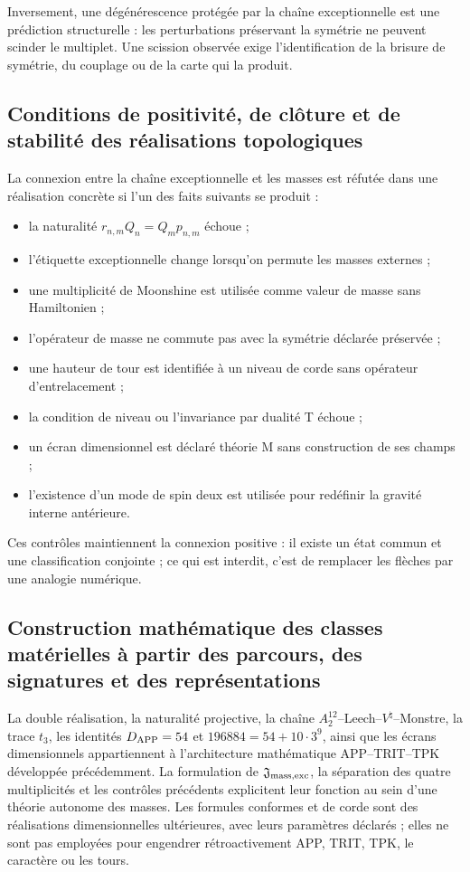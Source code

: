 Inversement, une dégénérescence protégée par la chaîne exceptionnelle est une prédiction structurelle : les perturbations préservant la symétrie ne peuvent scinder le multiplet. Une scission observée exige l’identification de la brisure de symétrie, du couplage ou de la carte qui la produit.

\subsection{Conditions de positivité, de clôture et de stabilité des réalisations topologiques}
La connexion entre la chaîne exceptionnelle et les masses est réfutée dans une réalisation concrète si l’un des faits suivants se produit :

\begin{itemize}
\item la naturalité \(r_{n,m}Q_n=Q_mp_{n,m}\) échoue ;
\item l’étiquette exceptionnelle change lorsqu’on permute les masses externes ;
\item une multiplicité de Moonshine est utilisée comme valeur de masse sans Hamiltonien ;
\item l’opérateur de masse ne commute pas avec la symétrie déclarée préservée ;
\item une hauteur de tour est identifiée à un niveau de corde sans opérateur d’entrelacement ;
\item la condition de niveau ou l’invariance par dualité T échoue ;
\item un écran dimensionnel est déclaré théorie M sans construction de ses champs ;
\item l’existence d’un mode de spin deux est utilisée pour redéfinir la gravité interne antérieure.

\end{itemize}
Ces contrôles maintiennent la connexion positive : il existe un état commun et une classification conjointe ; ce qui est interdit, c’est de remplacer les flèches par une analogie numérique.

\subsection{Construction mathématique des classes matérielles à partir des parcours, des signatures et des représentations}
La double réalisation, la naturalité projective, la chaîne \(A_2^{12}\)--Leech--\(V^\natural\)--Monstre, la trace \(t_3\), les identités \(D_{\rm APP}=54\) et \(196884=54+10\cdot3^9\), ainsi que les écrans dimensionnels appartiennent à l’architecture mathématique APP--TRIT--TPK développée précédemment. La formulation de \(\mathfrak J_{\rm mass,exc}\), la séparation des quatre multiplicités et les contrôles précédents explicitent leur fonction au sein d’une théorie autonome des masses. Les formules conformes et de corde sont des réalisations dimensionnelles ultérieures, avec leurs paramètres déclarés ; elles ne sont pas employées pour engendrer rétroactivement APP, TRIT, TPK, le caractère ou les tours.
